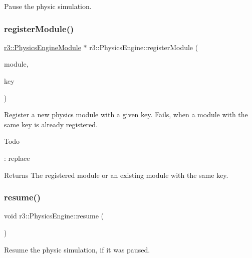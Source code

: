 Pause the physic simulation. 

\mbox{\label{classr3_1_1_physics_engine_aead3d2707fa52fc65701a55b811b571e}} 
\subsubsection{\texorpdfstring{register\+Module()}{registerModule()}}
{\footnotesize\ttfamily \mbox{\hyperlink{classr3_1_1_physics_engine_module}{r3\+::\+Physics\+Engine\+Module}} $\ast$ r3\+::\+Physics\+Engine\+::register\+Module (\begin{DoxyParamCaption}\item[{\mbox{\hyperlink{classr3_1_1_physics_engine_module}{Physics\+Engine\+Module}} $\ast$}]{module,  }\item[{const std\+::string \&}]{key }\end{DoxyParamCaption})}



Register a new physics module with a given key. Fails, when a module with the same key is already registered. 

\begin{DoxyRefDesc}{Todo}
\item[\mbox{\hyperlink{todo__todo000006}{Todo}}]\+: replace \end{DoxyRefDesc}
\begin{DoxyReturn}{Returns}
The registered module or an existing module with the same key. 
\end{DoxyReturn}
\mbox{\label{classr3_1_1_physics_engine_a149087534c28ba2d5118a2b6d652491c}} 
\subsubsection{\texorpdfstring{resume()}{resume()}}
{\footnotesize\ttfamily void r3\+::\+Physics\+Engine\+::resume (\begin{DoxyParamCaption}{ }\end{DoxyParamCaption})}



Resume the physic simulation, if it was paused. 

